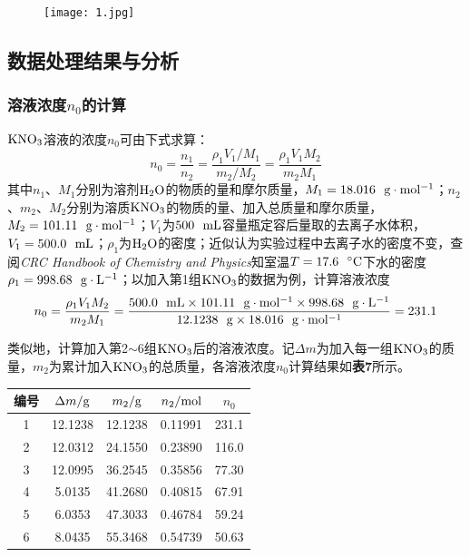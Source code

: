 \documentclass[12pt]{article}
\begin{document}
\begin{figure}[h]
	\centering
	\texttt{[image: 1.jpg]}
\end{figure}
\par

\vbox{}


 \subsection{数据处理结果与分析}
 \subsubsection{溶液浓度$n_{0}$的计算}
$\rm KNO_{3}$溶液的浓度$n_{0}$可由下式求算：
$$
n_{0}=\frac{n_{1}}{n_{2}}=\frac{\rho_{1}V_{1}/M_{1}}{m_{2}/M_{2}}=\frac{\rho_{1} V_{1} M_{2}}{m_{2} M_{1}}
$$
其中$n_{1}$、$M_{1}$分别为溶剂$\rm H_{2}O$的物质的量和摩尔质量，$M_{1}=18.016\ \ {\rm g\cdot mol^{-1}}$；$n_{2}$、$m_{2}$、$M_{2}$分别为溶质$\rm KNO_{3}$的物质的量、加入总质量和摩尔质量，$M_{2}=101.11\ \ {\rm g\cdot mol^{-1}}$；$V_{1}$为$500\ \ {\rm mL}$容量瓶定容后量取的去离子水体积，$V_{1}=500.0\ \ {\rm mL}$；$\rho_{1}$为$\rm H_{2}O$的密度；近似认为实验过程中去离子水的密度不变，查阅\textit{CRC Handbook of Chemistry and Physics}\citealp{crc}知室温$T=17.6\ \ {\rm ^{\circ}C}$下水的密度$\rho_{1}=998.68\ \ {\rm g\cdot L^{-1}}$；以加入第1组$\rm KNO_{3}$的数据为例，计算溶液浓度
$$
n_{0}=\frac{\rho_{1} V_{1} M_{2}}{m_{2} M_{1}}=\frac{ 500.0\ \ {\rm mL} \times 101.11\ \ {\rm g\cdot mol^{-1}} \times 998.68\ \ {\rm g\cdot L^{-1}}}{12.1238\ \ {\rm g} \times 18.016\ \ {\rm g\cdot mol^{-1}}}=231.1
$$
\par 
类似地，计算加入第2$\sim$6组$\rm KNO_{3}$后的溶液浓度。记$\Delta m$为加入每一组$\rm KNO_{3}$的质量，$m_{2}$为累计加入$\rm KNO_{3}$的总质量，各溶液浓度$n_{0}$计算结果如\textbf{表7}所示。
\begin{table}[h]
	\centering
	\begin{tabular}{ccccc}
		\toprule
		编号 & $\Delta m/{\rm g}$ &  $m_{2}/{\rm g}$ & $n_{2}/{\rm mol}$ & $n_{0}$ \\
		\midrule
		1 & 12.1238 & 12.1238 & 0.11991 & 231.1 \\
		2 & 12.0312 & 24.1550 & 0.23890 & 116.0 \\
		3 & 12.0995 & 36.2545 & 0.35856 & 77.30 \\
		4 & 5.0135  & 41.2680 & 0.40815 & 67.91 \\
		5 & 6.0353  & 47.3033 & 0.46784 & 59.24 \\
		6 & 8.0435  & 55.3468 & 0.54739 & 50.63 \\
		\bottomrule
	\end{tabular}
\end{table}
\par
\end{document}
